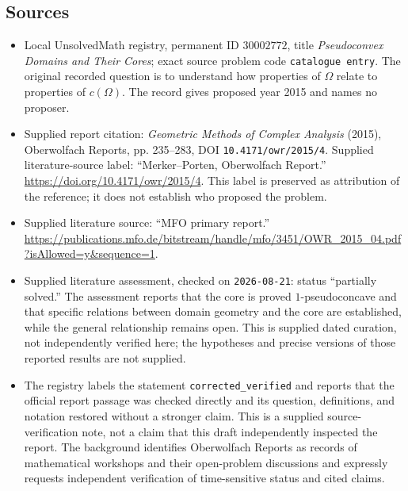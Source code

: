 \documentclass[11pt]{article}
\begin{document}
\subsection{Sources}
\begin{itemize}
\item Local UnsolvedMath registry, permanent ID \(30002772\), title \emph{Pseudoconvex Domains and Their Cores}; exact source problem code \texttt{catalogue entry}. The original recorded question is to understand how properties of \(\Omega\) relate to properties of \(c(\Omega)\). The record gives proposed year 2015 and names no proposer.
\item Supplied report citation: \emph{Geometric Methods of Complex Analysis} (2015), Oberwolfach Reports, pp. 235--283, DOI \texttt{10.4171/owr/2015/4}. Supplied literature-source label: ``Merker--Porten, Oberwolfach Report.'' \url{https://doi.org/10.4171/owr/2015/4}. This label is preserved as attribution of the reference; it does not establish who proposed the problem.
\item Supplied literature source: ``MFO primary report.'' \url{https://publications.mfo.de/bitstream/handle/mfo/3451/OWR_2015_04.pdf?isAllowed=y&sequence=1}.
\item Supplied literature assessment, checked on \texttt{2026-08-21}: status ``partially solved.'' The assessment reports that the core is proved \(1\)-pseudoconcave and that specific relations between domain geometry and the core are established, while the general relationship remains open. This is supplied dated curation, not independently verified here; the hypotheses and precise versions of those reported results are not supplied.
\item The registry labels the statement \texttt{corrected\_verified} and reports that the official report passage was checked directly and its question, definitions, and notation restored without a stronger claim. This is a supplied source-verification note, not a claim that this draft independently inspected the report. The background identifies Oberwolfach Reports as records of mathematical workshops and their open-problem discussions and expressly requests independent verification of time-sensitive status and cited claims.
\end{itemize}
\end{document}
